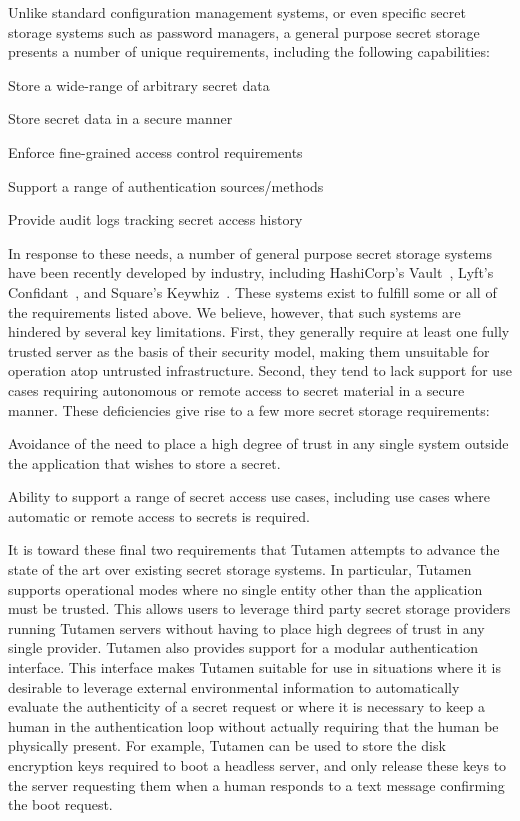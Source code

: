 Unlike standard configuration management systems, or even specific
secret storage systems such as password managers, a general purpose
secret storage presents a number of unique requirements, including the
following capabilities:

\begin{packed_item}
\item Store a wide-range of arbitrary secret data
\item Store secret data in a secure manner
\item Enforce fine-grained access control requirements
\item Support a range of authentication sources/methods
\item Provide audit logs tracking secret access history
\end{packed_item}

In response to these needs, a number of general purpose secret storage
systems have been recently developed by industry, including
HashiCorp's Vault~\cite{vault}, Lyft's Confidant~\cite{confidant}, and
Square's Keywhiz~\cite{keywhiz}. These systems exist to fulfill some
or all of the requirements listed above. We believe, however, that
such systems are hindered by several key limitations. First, they
generally require at least one fully trusted server as the basis of
their security model, making them unsuitable for operation atop
untrusted infrastructure. Second, they tend to lack support for use
cases requiring autonomous or remote access to secret material in a
secure manner. These deficiencies give rise to a few more secret
storage requirements:

\begin{packed_item}
\item Avoidance of the need to place a high degree of trust in any
  single system outside the application that wishes to store a secret.
\item Ability to support a range of secret access use cases, including
  use cases where automatic or remote access to secrets is required.
\end{packed_item}

It is toward these final two requirements that Tutamen attempts to
advance the state of the art over existing secret storage systems. In
particular, Tutamen supports operational modes where no single entity
other than the application must be trusted. This allows users to
leverage third party secret storage providers running Tutamen servers
without having to place high degrees of trust in any single
provider. Tutamen also provides support for a modular authentication
interface. This interface makes Tutamen suitable for use in situations
where it is desirable to leverage external environmental information
to automatically evaluate the authenticity of a secret request or
where it is necessary to keep a human in the authentication loop
without actually requiring that the human be physically present. For
example, Tutamen can be used to store the disk encryption keys
required to boot a headless server, and only release these keys to the
server requesting them when a human responds to a text message
confirming the boot request.


